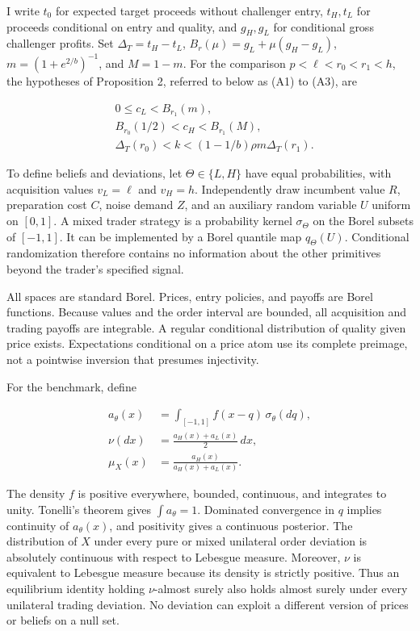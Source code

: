 \documentclass[
  11pt,
]{article}
\begin{document}
I write \(t_0\) for expected target proceeds without challenger entry,
\(t_H,t_L\) for proceeds conditional on entry and quality, and
\(g_H,g_L\) for conditional gross challenger profits. Set
\(\Delta_T=t_H-t_L\), \(B_r(\mu)=g_L+\mu(g_H-g_L)\),
\(m=(1+e^{2/b})^{-1}\), and \(M=1-m\). For the comparison
\(p<\ell<r_0<r_1<h\), the hypotheses of Proposition 2, referred to below
as (A1) to (A3), are

\[
\begin{aligned}
&0\le c_L<B_{r_1}(m),\\
&B_{r_0}(1/2)<c_H<B_{r_1}(M),\\
&\Delta_T(r_0)<k<(1-1/b)\rho m\Delta_T(r_1).
\end{aligned}
\tag{OA.1}\label{eq:oa-oa-1}
\]

To define beliefs and deviations, let \(\Theta\in\{L,H\}\) have equal
probabilities, with acquisition values \(v_L=\ell\) and \(v_H=h\).
Independently draw incumbent value \(R\), preparation cost \(C\), noise
demand \(Z\), and an auxiliary random variable \(U\) uniform on
\([0,1]\). A mixed trader strategy is a probability kernel
\(\sigma_\Theta\) on the Borel subsets of \([-1,1]\). It can be
implemented by a Borel quantile map \(q_\Theta(U)\). Conditional
randomization therefore contains no information about the other
primitives beyond the trader's specified signal.

All spaces are standard Borel. Prices, entry policies, and payoffs are
Borel functions. Because values and the order interval are bounded, all
acquisition and trading payoffs are integrable. A regular conditional
distribution of quality given price exists. Expectations conditional on
a price atom use its complete preimage, not a pointwise inversion that
presumes injectivity.

For the benchmark, define

\[
\begin{aligned}
a_\theta(x)&=\int_{[-1,1]}f(x-q)\,\sigma_\theta(dq),\\
\nu(dx)&=\frac{a_H(x)+a_L(x)}2\,dx,\\
\mu_X(x)&=\frac{a_H(x)}{a_H(x)+a_L(x)}.
\end{aligned}
\tag{OA.2}\label{eq:oa-oa-2}
\]

The density \(f\) is positive everywhere, bounded, continuous, and
integrates to unity. Tonelli's theorem gives \(\int a_\theta=1\).
Dominated convergence in \(q\) implies continuity of \(a_\theta(x)\),
and positivity gives a continuous posterior. The distribution of \(X\)
under every pure or mixed unilateral order deviation is absolutely
continuous with respect to Lebesgue measure. Moreover, \(\nu\) is
equivalent to Lebesgue measure because its density is strictly positive.
Thus an equilibrium identity holding \(\nu\)-almost surely also holds
almost surely under every unilateral trading deviation. No deviation can
exploit a different version of prices or beliefs on a null set.
\end{document}
